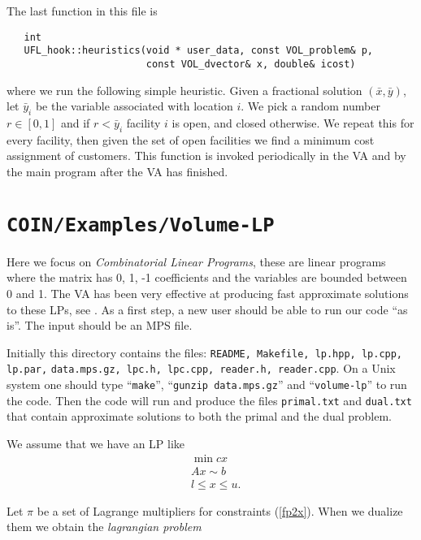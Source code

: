 \documentclass{article}
\begin{document}
The last function in this file is
\begin{verbatim}
   int 
   UFL_hook::heuristics(void * user_data, const VOL_problem& p,
                        const VOL_dvector& x, double& icost)
\end{verbatim}

\noindent where we run the following simple heuristic. 
Given a fractional solution $(\bar x, \bar y)$, let $\bar y_i$ be the variable
associated with location $i$. We pick a random number $r \in [ 0, 1 ]$ and if
$r < \bar y_i$ facility $i$ is open, and closed otherwise. We repeat this for
every facility, then given the set of open facilities we find a minimum cost
assignment of customers. This function is invoked periodically in the VA and
by the main program after the VA has finished.


\section{{\tt COIN/Examples/Volume-LP}}

Here we focus on {\it Combinatorial Linear Programs},
these are linear programs where the matrix has 0, 1, -1 coefficients
and the variables are bounded between 0 and 1. The VA has been very
effective at producing fast approximate solutions to these LPs, see
\cite{BA2}.
As a first step, a new user should be able to run our code ``as is''.
The input should be an MPS file.


Initially this directory contains the files: {\tt README, Makefile,
lp.hpp, lp.cpp, lp.par,} \goodbreak
{\tt data.mps.gz, lpc.h, lpc.cpp,
reader.h, reader.cpp}. On a Unix system one
should type ``{\tt make}'', ``{\tt gunzip data.mps.gz}'' and ``{\tt volume-lp}''
to run the code. Then the code will run and produce the files {\tt primal.txt}
and {\tt dual.txt} that contain approximate solutions to both the primal
and the dual problem.

\smallskip

We assume that we have an LP like
\begin{eqnarray}
&\min c x  \label{fp1x} \\
&Ax \sim b \label{fp2x} \\
&l \leq x \le u. \label{fp3x} 
\end{eqnarray}

Let $\pi$ be a set of
Lagrange multipliers for constraints (\ref{fp2x}). When we dualize 
them we obtain the {\it lagrangian problem}
\end{document}
